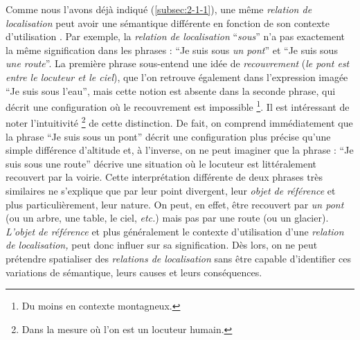 Comme nous l'avons déjà indiqué (\autoref{subsec:2-1-1}), une même
\emph{relation de localisation} peut avoir une sémantique différente
en fonction de son contexte d'utilisation
\autocite[16]{Borillo1998}. Par exemple, la \emph{relation de
  localisation} \enquote{\emph{sous}} n'a pas exactement la même
signification dans les phrases : \enquote{Je suis sous \emph{un pont}}
et \enquote{Je suis sous \emph{une route}}. La première phrase
sous-entend une idée de \emph{recouvrement} (\ie \emph{le pont est
  entre le locuteur et le ciel}), que l'on retrouve également dans
l'expression imagée \enquote{Je suis sous l'eau}, mais cette notion
est absente dans la seconde phrase, qui décrit une configuration où le
recouvrement est impossible \footnote{Du moins en contexte
  montagneux.}. Il est intéressant de noter l'intuitivité
\footnote{Dans la mesure où l'on est un locuteur humain.} de cette
distinction. De fait, on comprend immédiatement que la phrase
\enquote{Je suis sous un pont} décrit une configuration plus précise
qu'une simple différence d'altitude et, à l'inverse, on ne peut
imaginer que la phrase : \enquote{Je suis sous une route} décrive une
situation où le locuteur est littéralement recouvert par la
voirie. Cette interprétation différente de deux phrases très
similaires ne s'explique que par leur point divergent, leur
\emph{objet de référence} et plus particulièrement, leur nature. On
peut, en effet, être recouvert par \emph{un pont} (ou un arbre, une
table, le ciel, \emph{etc.}) mais pas par une route (ou un
glacier). \emph{L'objet de référence} et plus généralement le contexte
d'utilisation d'une \emph{relation de localisation,} peut donc influer
sur sa signification. Dès lors, on ne peut prétendre spatialiser des
\emph{relations de localisation} sans être capable d'identifier ces
variations de sémantique, leurs causes et leurs conséquences.

